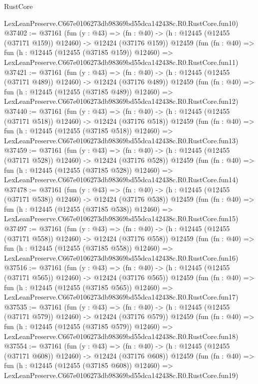 \begin{lexlean}{RustCore}
\begin{coremodule}
    LexLeanPreserve.C667e0106273db98369bd55dca142438c.R0.RustCore.fun10)
@37402 := @37161
    (fun (y : @43) =>
    (fn : @40) -> (h : @12445 (@12455 (@37171 @159)) @12460) -> @12424 (@37176 @159))
    @12459
    (fun (fn : @40) =>
    fun (h : @12445 (@12455 (@37185 @159)) @12460) =>
    LexLeanPreserve.C667e0106273db98369bd55dca142438c.R0.RustCore.fun11)
@37421 := @37161
    (fun (y : @43) =>
    (fn : @40) -> (h : @12445 (@12455 (@37171 @489)) @12460) -> @12424 (@37176 @489))
    @12459
    (fun (fn : @40) =>
    fun (h : @12445 (@12455 (@37185 @489)) @12460) =>
    LexLeanPreserve.C667e0106273db98369bd55dca142438c.R0.RustCore.fun12)
@37440 := @37161
    (fun (y : @43) =>
    (fn : @40) -> (h : @12445 (@12455 (@37171 @518)) @12460) -> @12424 (@37176 @518))
    @12459
    (fun (fn : @40) =>
    fun (h : @12445 (@12455 (@37185 @518)) @12460) =>
    LexLeanPreserve.C667e0106273db98369bd55dca142438c.R0.RustCore.fun13)
@37459 := @37161
    (fun (y : @43) =>
    (fn : @40) -> (h : @12445 (@12455 (@37171 @528)) @12460) -> @12424 (@37176 @528))
    @12459
    (fun (fn : @40) =>
    fun (h : @12445 (@12455 (@37185 @528)) @12460) =>
    LexLeanPreserve.C667e0106273db98369bd55dca142438c.R0.RustCore.fun14)
@37478 := @37161
    (fun (y : @43) =>
    (fn : @40) -> (h : @12445 (@12455 (@37171 @538)) @12460) -> @12424 (@37176 @538))
    @12459
    (fun (fn : @40) =>
    fun (h : @12445 (@12455 (@37185 @538)) @12460) =>
    LexLeanPreserve.C667e0106273db98369bd55dca142438c.R0.RustCore.fun15)
@37497 := @37161
    (fun (y : @43) =>
    (fn : @40) -> (h : @12445 (@12455 (@37171 @558)) @12460) -> @12424 (@37176 @558))
    @12459
    (fun (fn : @40) =>
    fun (h : @12445 (@12455 (@37185 @558)) @12460) =>
    LexLeanPreserve.C667e0106273db98369bd55dca142438c.R0.RustCore.fun16)
@37516 := @37161
    (fun (y : @43) =>
    (fn : @40) -> (h : @12445 (@12455 (@37171 @565)) @12460) -> @12424 (@37176 @565))
    @12459
    (fun (fn : @40) =>
    fun (h : @12445 (@12455 (@37185 @565)) @12460) =>
    LexLeanPreserve.C667e0106273db98369bd55dca142438c.R0.RustCore.fun17)
@37535 := @37161
    (fun (y : @43) =>
    (fn : @40) -> (h : @12445 (@12455 (@37171 @579)) @12460) -> @12424 (@37176 @579))
    @12459
    (fun (fn : @40) =>
    fun (h : @12445 (@12455 (@37185 @579)) @12460) =>
    LexLeanPreserve.C667e0106273db98369bd55dca142438c.R0.RustCore.fun18)
@37554 := @37161
    (fun (y : @43) =>
    (fn : @40) -> (h : @12445 (@12455 (@37171 @608)) @12460) -> @12424 (@37176 @608))
    @12459
    (fun (fn : @40) =>
    fun (h : @12445 (@12455 (@37185 @608)) @12460) =>
    LexLeanPreserve.C667e0106273db98369bd55dca142438c.R0.RustCore.fun19)

\end{coremodule}
\end{lexlean}
